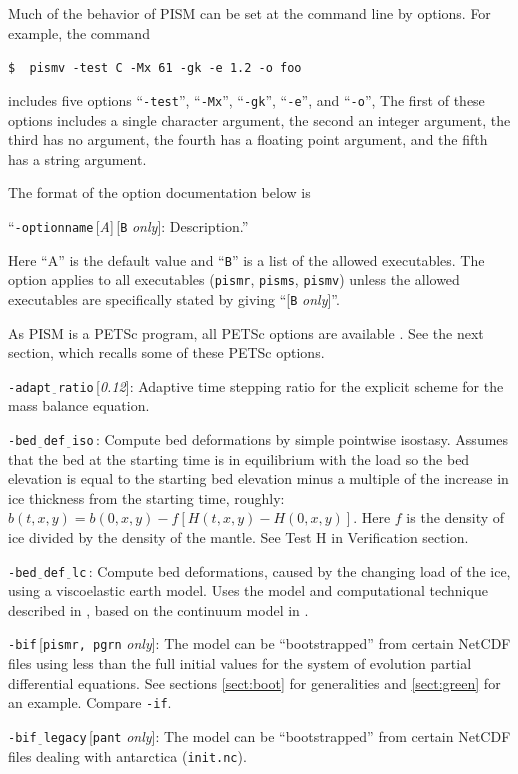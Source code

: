 \documentclass[11pt,final]{amsart}
\renewcommand{\t}[1]{\texttt{#1}}
\newcommand{\rawopt}[1]{\vspace{1mm}\noindent \large\texttt{-#1}\normalsize}
\newcommand{\opt}[1]{\rawopt{#1}\,:\quad}
\newcommand{\optdef}[2]{\rawopt{#1}\,[\textsl{#2}]:\quad}
\newcommand{\optrestrict}[2]{\rawopt{#1}\,[\texttt{#2} \textsl{only}]:\quad}
\newcommand{\optdefrestrict}[3]{\rawopt{#1}\,[\textsl{#2}]\,[\texttt{#3} \textsl{only}]:\quad}
\newcommand{\und}{$\underline{\,\,\,}$}
\begin{document}
Much of the behavior of PISM can be set at the command line by options.  For example, the command 

\verb|$  pismv -test C -Mx 61 -gk -e 1.2 -o foo|

\noindent includes five options ``\verb|-test|'', ``\verb|-Mx|'', ``\verb|-gk|'', ``\verb|-e|'', and ``\verb|-o|'',  The first of these options includes a single character argument, the second an integer argument, the third has no argument, the fourth has a floating point argument, and the fifth has a string argument.

The format of the option documentation below is

\centerline{``\optdefrestrict{optionname}{A}{B} Description.''}

\noindent Here ``A'' is the default value and ``\t{B}'' is a list of the allowed executables.  The option applies to all executables (\verb|pismr|, \verb|pisms|, \verb|pismv|) unless the allowed executables are specifically stated by giving ``[\t{B} \textsl{only}]''.

As PISM is a PETSc program, all PETSc options are available \cite{petsc-user-ref}.  See the next section, which recalls some of these PETSc options.
\bigskip

\optdef{adapt\und ratio}{0.12}  Adaptive time stepping ratio for the explicit scheme for the mass balance equation.

\opt{bed\und def\und iso} Compute bed deformations by simple pointwise isostasy.  Assumes that the bed at the starting time is in equilibrium with the load so the bed elevation is equal to the starting bed elevation minus a multiple of the increase in ice thickness from the starting time, roughly: $b(t,x,y) = b(0,x,y) - f [H(t,x,y) - H(0,x,y)]$.  Here $f$ is the density of ice divided by the density of the mantle.  See Test H in Verification section.

\opt{bed\und def\und lc} Compute bed deformations, caused by the changing load of the ice, using a viscoelastic earth model.  Uses the model and computational technique described in \cite{BLKfastearth}, based on the continuum model in \cite{LingleClark}.

\optrestrict{bif}{pismr, pgrn}  The model can be ``bootstrapped'' from certain NetCDF files using less than the full initial values for the system of evolution partial differential equations.  See sections \ref{sect:boot} for generalities and \ref{sect:green} for an example.  Compare \verb|-if|.

\optrestrict{bif\und legacy}{pant}  The model can be ``bootstrapped'' from certain NetCDF files dealing with antarctica (\verb|init.nc|).
\end{document}
